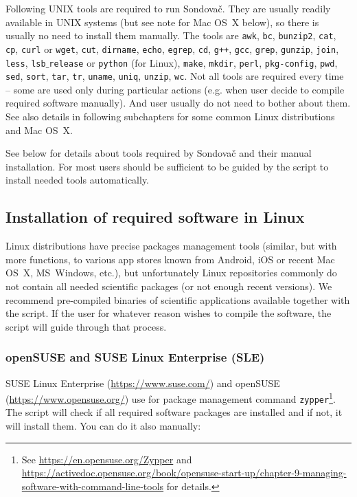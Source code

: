 \documentclass[a4paper, 11pt, twoside]{article}
\begin{document}
Following UNIX tools are required to run Sondovač. They are usually readily available in UNIX systems (but see note for Mac OS~X below), so there is usually no need to install them manually. The tools are \texttt{awk}, \texttt{bc}, \texttt{bunzip2}, \texttt{cat}, \texttt{cp}, \texttt{curl} or \texttt{wget}, \texttt{cut}, \texttt{dirname}, \texttt{echo}, \texttt{egrep}, \texttt{cd}, \texttt{g++}, \texttt{gcc}, \texttt{grep}, \texttt{gunzip}, \texttt{join}, \texttt{less}, \texttt{lsb$\_$release} or \texttt{python} (for Linux), \texttt{make}, \texttt{mkdir}, \texttt{perl}, \texttt{pkg-config}, \texttt{pwd}, \texttt{sed}, \texttt{sort}, \texttt{tar}, \texttt{tr}, \texttt{uname}, \texttt{uniq}, \texttt{unzip}, \texttt{wc}. Not all tools are required every time -- some are used only during particular actions (e.g. when user decide to compile required software manually). And user usually do not need to bother about them. See also details in following subchapters for some common Linux distributions and Mac OS~X.

See below for details about tools required by Sondovač and their manual installation. For most users should be sufficient to be guided by the script to install needed tools automatically.

\subsection{Installation of required software in Linux}
\label{required-linux}

Linux distributions have precise packages management tools (similar, but with more functions, to various app stores known from Android, iOS or recent Mac OS~X, MS~Windows, etc.), but unfortunately Linux repositories commonly do not contain all needed scientific packages (or not enough recent versions). We recommend pre-compiled binaries of scientific applications available together with the script. If the user for whatever reason wishes to compile the software, the script will guide through that process.

\subsubsection{openSUSE and SUSE Linux Enterprise (SLE)}

SUSE Linux Enterprise (\href{https://www.suse.com/}{https://www.suse.com/}) and openSUSE (\href{https://www.opensuse.org/}{https://www.opensuse.org/}) use for package management command \texttt{zypper}\footnote{See \href{https://en.opensuse.org/Zypper}{https://en.opensuse.org/Zypper} and \href{https://activedoc.opensuse.org/book/opensuse-start-up/chapter-9-managing-software-with-command-line-tools}{https://activedoc.opensuse.org/book/opensuse-start-up/chapter-9-managing-software-with-command-line-tools} for details.}. The script will check if all required software packages are installed and if not, it will install them. You can do it also manually:
\end{document}
